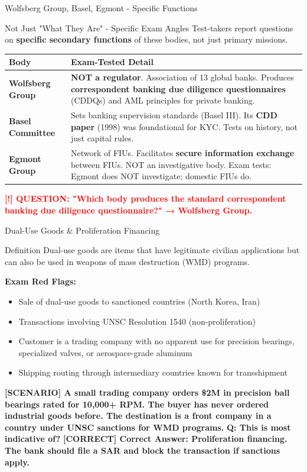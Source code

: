 \documentclass[11pt,a4paper]{beamer}
\newcommand{\redflag}[1]{\textcolor{red}{\textbf{[!] #1}}}
\newcommand{\correct}[1]{\textcolor{green!50!black}{\textbf{[CORRECT] #1}}}
\newcommand{\scenario}[1]{\textcolor{blue!70!black}{\textbf{[SCENARIO] #1}}}
\begin{document}
\begin{frame}{Wolfsberg Group, Basel, Egmont - Specific Functions}
\begin{block}{Not Just "What They Are" - Specific Exam Angles}
Test-takers report questions on \textbf{specific secondary functions} of these bodies, not just primary missions.
\end{block}
\begin{tabular}{p{}|p{}}
\hline
\rowcolor{lightgray}
\textbf{Body} & \textbf{Exam-Tested Detail} \\
\hline
\textbf{Wolfsberg Group} & \textbf{NOT a regulator}. Association of 13 global banks. Produces \textbf{correspondent banking due diligence questionnaires} (CDDQs) and AML principles for private banking. \\
\hline
\textbf{Basel Committee} & Sets banking supervision standards (Basel III). Its \textbf{CDD paper} (1998) was foundational for KYC. Tests on history, not just capital rules. \\
\hline
\textbf{Egmont Group} & Network of FIUs. Facilitates \textbf{secure information exchange} between FIUs. NOT an investigative body. Exam tests: Egmont does NOT investigate; domestic FIUs do. \\
\hline
\end{tabular}
\redflag{QUESTION: "Which body produces the standard correspondent banking due diligence questionnaire?" → Wolfsberg Group.}
\end{frame}

\begin{frame}{Dual-Use Goods \& Proliferation Financing}
\begin{block}{Definition}
Dual-use goods are items that have legitimate civilian applications but can also be used in weapons of mass destruction (WMD) programs.
\end{block}
\textbf{Exam Red Flags:}
\begin{itemize}
\item Sale of dual-use goods to sanctioned countries (North Korea, Iran)
\item Transactions involving UNSC Resolution 1540 (non-proliferation)
\item Customer is a trading company with no apparent use for precision bearings, specialized valves, or aerospace-grade aluminum
\item Shipping routing through intermediary countries known for transshipment
\end{itemize}
\scenario{A small trading company orders \$2M in precision ball bearings rated for 10,000+ RPM. The buyer has never ordered industrial goods before. The destination is a front company in a country under UNSC sanctions for WMD programs.}
\vspace{0.1cm}
\textbf{Q: This is most indicative of?}
\correct{Correct Answer: Proliferation financing. The bank should file a SAR and block the transaction if sanctions apply.}
\end{frame}
\end{document}
